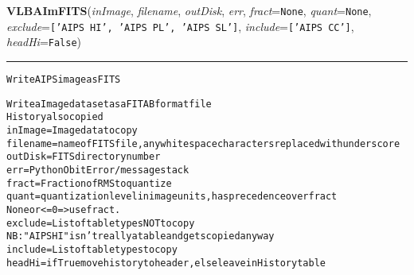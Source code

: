     \begin{boxedminipage}{\textwidth}

    \raggedright \textbf{VLBAImFITS}(\textit{inImage}, \textit{filename}, \textit{outDisk}, \textit{err}, \textit{fract}=\texttt{N\-o\-n\-e\-}, \textit{quant}=\texttt{N\-o\-n\-e\-}, \textit{exclude}=\texttt{[\-'\-A\-I\-P\-S\-~\-H\-I\-'\-,\-~\-'\-A\-I\-P\-S\-~\-P\-L\-'\-,\-~\-'\-A\-I\-P\-S\-~\-S\-L\-'\-]\-}, \textit{include}=\texttt{[\-'\-A\-I\-P\-S\-~\-C\-C\-'\-]\-}, \textit{headHi}=\texttt{F\-a\-l\-s\-e\-})

    \vspace{-1.5ex}

    \rule{\textwidth}{0.5\fboxrule}
\begin{alltt}
Write AIPS image as FITS

Write a Image data set as a FITAB format file
History also copied
inImage    = Image data to copy
filename   = name of FITS file, any whitespace characters replaced with underscore
outDisk    = FITS directory number
err        = Python Obit Error/message stack
fract      = Fraction of RMS to quantize
quant      = quantization level in image units, has precedence over fract
             None or {\textless}= 0 ={\textgreater} use fract.
exclude    = List of table types NOT to copy
             NB: "AIPS HI" isn't really a table and gets copied anyway
include    = List of table types to copy
headHi     = if True move history to header, else leave in History table\end{alltt}

    \vspace{1ex}

    \end{boxedminipage}

    \label{VLBACal:VLBAManPCal}
    \vspace{0.5ex}

